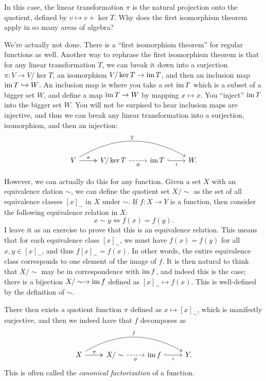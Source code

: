 In this case, the linear transformation $\pi $ is the natural projection onto the quotient, defined by $v\mapsto v+\ker T$. Why does the first isomorphism theorem apply in so many areas of algebra?

We're actually not done. There is a ``first isomorphism theorem'' for regular functions as well. Another way to rephrase the first isomorphism theorem is that for any linear transformation $T$, we can break it down into a surjection $\pi : V \to V/\ker T$, an isomorphism $V/\ker T\to \operatorname{im} T$, and then an inclusion map $\operatorname{im} T\hookrightarrow  W$. An inclusion map is where you take a set $\operatorname{im} T$ which is a subset of a bigger set $W$, and define a map $\operatorname{im} T\to W$ by mapping $x\mapsto x$. You ``inject'' $\operatorname{im} T$ into the bigger set $W$. You will not be surpised to hear inclusion maps are injective, and thus we can break any linear transformation into a surjection, isomorphism, and then an injection:
\[\begin{tikzcd}[row sep = 2.5em, column sep = 2.5em]
	V \ar[bend left, " T ", rrr] \ar[" \pi  ", two heads, r]  & V/\ker T\ar[dashed, " \phi  "', r]  & \im T \ar[hook, " i "', r] & W.
\end{tikzcd}\]

However, we can actually do this for any function. Given a set $X$ with an equivalence rlation $\sim $, we can define the quotient set $X/\sim $ as the set of all equivalence classes $[x]_\sim $ in $X$ under $\sim $. If $f : X \to Y$ is a function, then consider the following equivalence relation in $X$:
\[
	x\sim y \iff f(x)=f(y)
.\]
I leave it as an exercise to prove that this is an equivalence relation. This means that for each equivalence class $[x]_\sim $, we must have $f(x)=f(y)$ for all $x,y\in [x]_\sim $, and thus $f[x]_\sim =f(x)$. In other words, the entire equivalence class corresponds to one element of the image of $f$. It is then natural to think that $X/\sim $ may be in correspondence with $\operatorname{im} f$, and indeed this is the case; there is a bijection $X/\sim \to \operatorname{im} f$ defined as $[x]_\sim \mapsto f\left( x \right) $. This is well-defined by the definition of $\sim $.

There then exists a quotient function $\pi $ defined as $x\mapsto [x]_\sim $, which is manifestly surjective, and then we indeed have that $f$ decomposes as
\[\begin{tikzcd}[row sep = 2.5em, column sep = 2.5em]
	X \ar[bend left, " f ", rrr] \ar[" \pi  ", two heads, r]  & X/\sim \ar[dashed, " \phi  "', r]  & \im f \ar[hook, " i "', r] & Y.
\end{tikzcd}\]
This is often called the \emph{canonical factorization} of a function.

